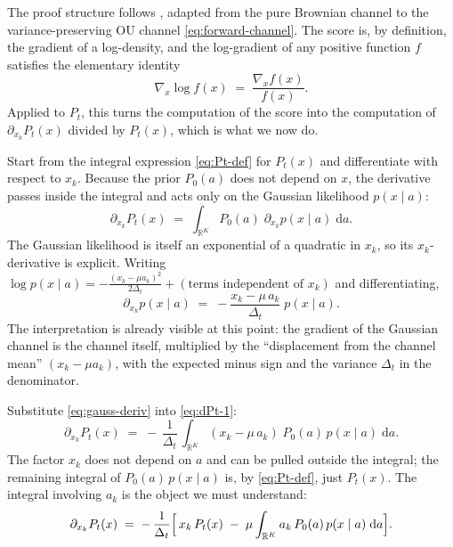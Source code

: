 \documentclass[11pt]{article}
\theoremstyle{definition}
\newcommand{\R}{\mathbb{R}}
\newcommand{\Detl}{\Delta_t}
\begin{document}
\begin{derivation}
The proof structure follows \cite[\S\,2]{Thiery2023}, adapted from the
pure Brownian channel to the variance-preserving OU channel
\eqref{eq:forward-channel}. The score is, by definition, the gradient
of a log-density, and the log-gradient of any positive function
\(f\) satisfies the elementary identity
\begin{equation}\label{eq:log-grad}
    \nabla_x \log f(x) \;=\; \frac{\nabla_x f(x)}{f(x)}.
\end{equation}
Applied to \(P_t\), this turns the computation of the score into
the computation of \(\partial_{x_k} P_t(x)\) divided by \(P_t(x)\),
which is what we now do.

Start from the integral expression \eqref{eq:Pt-def} for \(P_t(x)\)
and differentiate with respect to \(x_k\). Because the prior \(P_0(a)\)
does not depend on \(x\), the derivative passes inside the integral
and acts only on the Gaussian likelihood \(p(x \mid a)\):
\begin{equation}\label{eq:dPt-1}
    \partial_{x_k} P_t(x)
    \;=\;
    \int_{\R^K} P_0(a)\;
    \partial_{x_k} p(x \mid a) \; \mathrm d a.
\end{equation}
The Gaussian likelihood is itself an exponential of a quadratic in
\(x_k\), so its \(x_k\)-derivative is explicit. Writing
\(\log p(x \mid a)
= -\frac{(x_k - \mu a_k)^2}{2 \Detl} + (\text{terms independent of }x_k)\)
and differentiating,
\begin{equation}\label{eq:gauss-deriv}
    \partial_{x_k} p(x \mid a)
    \;=\;
    -\frac{x_k - \mu\, a_k}{\Detl}\; p(x \mid a).
\end{equation}
The interpretation is already visible at this point: the gradient of
the Gaussian channel is the channel itself, multiplied by the
``displacement from the channel mean'' \((x_k - \mu a_k)\), with the
expected minus sign and the variance \(\Detl\) in the denominator.

Substitute \eqref{eq:gauss-deriv} into \eqref{eq:dPt-1}:
\begin{equation}\label{eq:dPt-2}
    \partial_{x_k} P_t(x)
    \;=\;
    -\,\frac{1}{\Detl}\,
    \int_{\R^K}
    (x_k - \mu\, a_k)\; P_0(a)\, p(x \mid a)\; \mathrm d a.
\end{equation}
The factor \(x_k\) does not depend on \(a\) and can be pulled
outside the integral; the remaining integral of \(P_0(a)\, p(x \mid a)\)
is, by \eqref{eq:Pt-def}, just \(P_t(x)\). The integral involving
\(a_k\) is the object we must understand:
\begin{equation}
    \partial_{x_k} P_t(x)
    \;=\;
    -\,\frac{1}{\Detl}
    \Bigl[\,
        x_k\, P_t(x)
        \;-\;
        \mu
        \int_{\R^K}
        a_k\, P_0(a)\, p(x \mid a)\; \mathrm d a
    \Bigr].
\end{equation}


\end{derivation}
\end{document}

